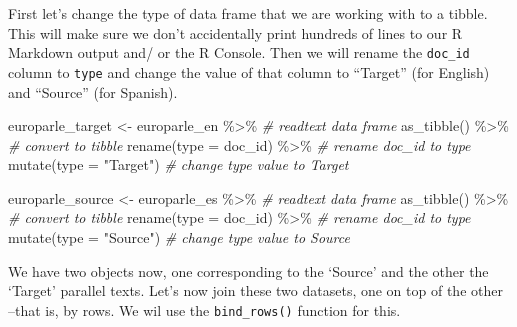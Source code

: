 \documentclass[
]{article}
\newenvironment{Shaded}{\begin{snugshade}}{\end{snugshade}}
\newcommand{\AttributeTok}[1]{\textcolor[rgb]{0.77,0.63,0.00}{#1}}
\newcommand{\CommentTok}[1]{\textcolor[rgb]{0.56,0.35,0.01}{\textit{#1}}}
\newcommand{\FunctionTok}[1]{\textcolor[rgb]{0.00,0.00,0.00}{#1}}
\newcommand{\NormalTok}[1]{#1}
\newcommand{\OtherTok}[1]{\textcolor[rgb]{0.56,0.35,0.01}{#1}}
\newcommand{\SpecialCharTok}[1]{\textcolor[rgb]{0.00,0.00,0.00}{#1}}
\newcommand{\StringTok}[1]{\textcolor[rgb]{0.31,0.60,0.02}{#1}}
\begin{document}
First let's change the type of data frame that we are working with to a tibble. This will make sure we don't accidentally print hundreds of lines to our R Markdown output and/ or the R Console. Then we will rename the \texttt{doc\_id} column to \texttt{type} and change the value of that column to ``Target'' (for English) and ``Source'' (for Spanish).

\begin{Shaded}
\begin{Highlighting}[]
\NormalTok{europarle\_target }\OtherTok{\textless{}{-}} 
\NormalTok{  europarle\_en }\SpecialCharTok{\%\textgreater{}\%} \CommentTok{\# readtext data frame}
  \FunctionTok{as\_tibble}\NormalTok{() }\SpecialCharTok{\%\textgreater{}\%} \CommentTok{\# convert to tibble}
  \FunctionTok{rename}\NormalTok{(}\AttributeTok{type =}\NormalTok{ doc\_id) }\SpecialCharTok{\%\textgreater{}\%} \CommentTok{\# rename doc\_id to type}
  \FunctionTok{mutate}\NormalTok{(}\AttributeTok{type =} \StringTok{"Target"}\NormalTok{) }\CommentTok{\# change type value to \textquotesingle{}Target\textquotesingle{}}

\NormalTok{europarle\_source }\OtherTok{\textless{}{-}} 
\NormalTok{  europarle\_es }\SpecialCharTok{\%\textgreater{}\%} \CommentTok{\# readtext data frame}
  \FunctionTok{as\_tibble}\NormalTok{() }\SpecialCharTok{\%\textgreater{}\%} \CommentTok{\# convert to tibble}
  \FunctionTok{rename}\NormalTok{(}\AttributeTok{type =}\NormalTok{ doc\_id) }\SpecialCharTok{\%\textgreater{}\%} \CommentTok{\# rename doc\_id to type}
  \FunctionTok{mutate}\NormalTok{(}\AttributeTok{type =} \StringTok{"Source"}\NormalTok{) }\CommentTok{\# change type value to \textquotesingle{}Source\textquotesingle{}}
\end{Highlighting}
\end{Shaded}

We have two objects now, one corresponding to the `Source' and the other the `Target' parallel texts. Let's now join these two datasets, one on top of the other --that is, by rows. We wil use the \texttt{bind\_rows()} function for this.

\begin{Shaded}
\end{Shaded}
\end{document}

